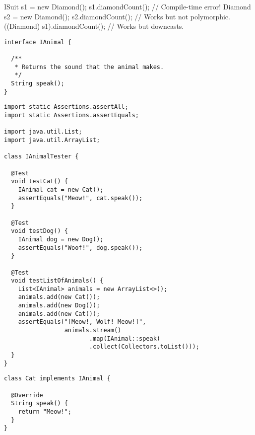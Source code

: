 \begin{verbnobox}[\small]
ISuit s1 = new Diamond();
s1.diamondCount();             // Compile-time error!
Diamond s2 = new Diamond();
s2.diamondCount();             // Works but not polymorphic.
((Diamond) s1).diamondCount(); // Works but downcasts.
\end{verbnobox}


\begin{lstlisting}[language=MyJava]
interface IAnimal {

  /**
   * Returns the sound that the animal makes.
   */
  String speak();
}
\end{lstlisting}

\begin{lstlisting}[language=MyJava]
import static Assertions.assertAll;
import static Assertions.assertEquals;

import java.util.List;
import java.util.ArrayList;

class IAnimalTester {
  
  @Test
  void testCat() {
    IAnimal cat = new Cat();
    assertEquals("Meow!", cat.speak());
  }

  @Test
  void testDog() {
    IAnimal dog = new Dog();
    assertEquals("Woof!", dog.speak());
  }

  @Test
  void testListOfAnimals() {
    List<IAnimal> animals = new ArrayList<>();
    animals.add(new Cat());
    animals.add(new Dog());
    animals.add(new Cat());
    assertEquals("[Meow!, Wolf! Meow!]", 
                 animals.stream()
                        .map(IAnimal::speak)
                        .collect(Collectors.toList()));
  }
}
\end{lstlisting}

\begin{lstlisting}[language=MyJava]
class Cat implements IAnimal {

  @Override
  String speak() { 
    return "Meow!"; 
  }
}
\end{lstlisting}

